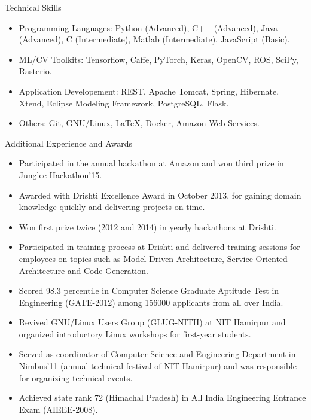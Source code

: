 \documentclass[]{mcdowellcv}
\begin{document}
    \begin{cvsection}{Technical Skills}
        \begin{cvsubsection}{}{}{}    
            \begin{itemize}
                \item Programming Languages: Python (Advanced), C++ (Advanced), Java (Advanced), C (Intermediate), Matlab (Intermediate), JavaScript (Basic).
                \item ML/CV Toolkits: Tensorflow, Caffe, PyTorch, Keras, OpenCV, ROS, SciPy, Rasterio.
                \item Application Developement: REST, Apache Tomcat, Spring, Hibernate, Xtend, Eclipse Modeling Framework, PostgreSQL, Flask.
                \item Others: Git, GNU/Linux, LaTeX, Docker, Amazon Web Services.
            \end{itemize}
        \end{cvsubsection}
    \end{cvsection}
    
    \begin{cvsection}{Additional Experience and Awards}
        \begin{cvsubsection}{}{}{}    
            \begin{itemize}
                \item Participated in the annual hackathon at Amazon and won third prize in Junglee Hackathon’15.
                \item Awarded with Drishti Excellence Award in October 2013, for gaining domain knowledge quickly and delivering projects on time.
                \item Won first prize twice (2012 and 2014) in yearly hackathons at Drishti.
                \item Participated in training process at Drishti and delivered training sessions for employees on topics such as Model Driven Architecture, Service Oriented Architecture and Code Generation.
                \item Scored 98.3 percentile in Computer Science Graduate Aptitude Test in Engineering (GATE-2012) among 156000 applicants from all over India.
                \item Revived GNU/Linux Users Group (GLUG-NITH) at NIT Hamirpur and organized introductory Linux workshops for first-year students.
                \item Served as coordinator of Computer Science and Engineering Department in Nimbus'11 (annual technical festival of NIT Hamirpur) and was responsible for organizing technical events.
                \item Achieved state rank 72 (Himachal Pradesh) in All India Engineering Entrance Exam (AIEEE-2008).

            \end{itemize}
        \end{cvsubsection}
    \end{cvsection}
    
\end{document}
